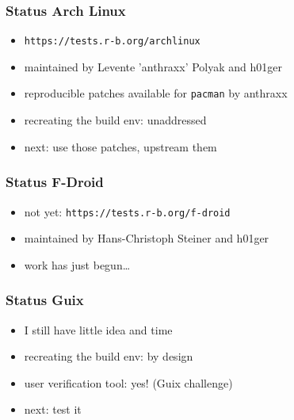 \documentclass[14pt]{beamer}
\begin{document}
\begin{frame}
 \frametitle{Status Arch Linux}
 \begin{itemize}
  \item \texttt{https://tests.r-b.org/archlinux}
  \item maintained by Levente 'anthraxx' Polyak and h01ger
  \item reproducible patches available for \texttt{pacman} by anthraxx
  \item recreating the build env: unaddressed
  \item next: use those patches, upstream them
 \end{itemize}
\end{frame}

\begin{frame}
 \frametitle{Status F-Droid}
 \begin{itemize}
  \item not yet: \texttt{https://tests.r-b.org/f-droid}
  \item maintained by Hans-Christoph Steiner and h01ger
  \item work has just begun…
 \end{itemize}
\end{frame}

\begin{frame}
 \frametitle{Status Guix}
 \begin{itemize}
  \item I still have little idea and time
  \item recreating the build env: by design
  \item user verification tool: yes! (Guix challenge)
  \item next: test it
 \end{itemize}
\end{frame}
\end{document}
